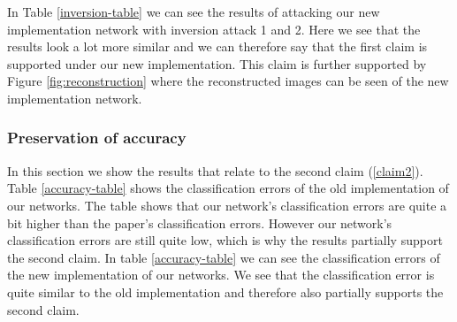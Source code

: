 

In Table \ref{inversion-table} we can see the results of attacking our new implementation network with inversion attack 1 and 2. Here we see that the results look a lot more similar and we can therefore say that the first claim is supported under our new implementation. This claim is further supported by Figure \ref{fig:reconstruction} where the reconstructed images can be seen of the new implementation network.

\subsubsection{Preservation of accuracy}
In this section we show the results that relate to the second claim (\ref{claim2}). 
Table \ref{accuracy-table} shows the classification errors of the old implementation of our networks. The table shows that our network's classification errors are quite a bit higher than the paper's classification errors. However our network's classification errors are still quite low, which is why the results partially support the second claim.
In table \ref{accuracy-table} we can see the classification errors of the new implementation of our networks. We see that the classification error is quite similar to the old implementation and therefore also partially supports the second claim.

